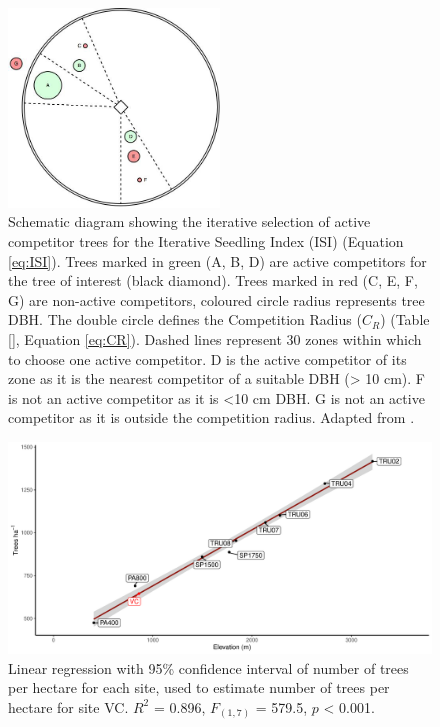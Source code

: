 \documentclass[a4paper, 11pt]{article}
\begin{document}
\begin{figure}[H]
\includegraphics[width=0.5\textwidth]{hegyi}
\centering
\caption{Schematic diagram showing the iterative selection of active competitor trees for the Iterative Seedling Index (ISI) (Equation \ref{eq:ISI}). Trees marked in green (A, B, D) are active competitors for the tree of interest (black diamond). Trees marked in red (C, E, F, G) are non-active competitors, coloured circle radius represents tree DBH. The double circle defines the Competition Radius ($C_R$) (Table \ref{}, Equation \ref{eq:CR}). Dashed lines represent 30\textdegree{} zones within which to choose one active competitor. D is the active competitor of its zone as it is the nearest competitor of a suitable DBH (\textgreater{} 10 cm). F is not an active competitor as it is \textless{}10 cm DBH. G is not an active competitor as it is outside the competition radius. Adapted from \citet{Lee2004}.}
\label{hegyi}
\end{figure}

\begin{figure}[H]
\includegraphics[width=\textwidth]{comp_radius_fit}
\centering
\caption{Linear regression with 95\% confidence interval of number of trees per hectare for each site, used to estimate number of trees per hectare for site VC. $R^2$ = 0.896, $F_{(1,7)}$ = 579.5, $p$ \textless{} 0.001.}
\label{fig:comp_radius_fit}
\end{figure}
\end{document}
